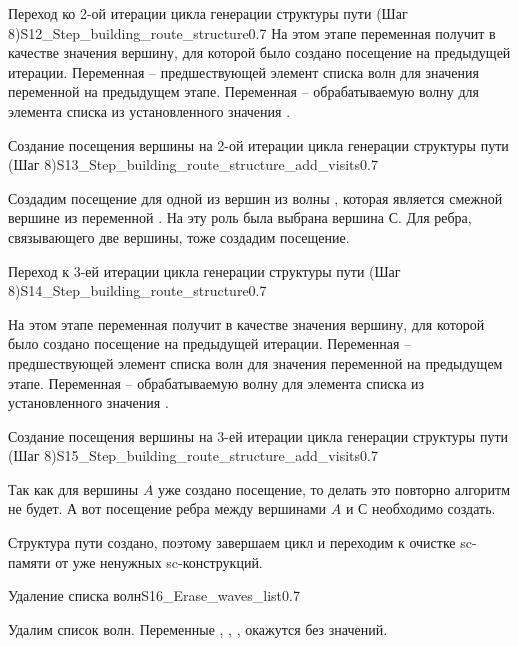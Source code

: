 \begin{itemize}
\begin{algostep}{Переход ко 2-ой итерации цикла генерации структуры
    пути (Шаг 8)}{S12_Step_building_route_structure}{0.7}
  На этом этапе переменная  получит в качестве
  значения вершину, для которой было создано посещение на предыдущей
  итерации. Переменная  – предшествующей элемент
  списка волн для значения переменной  на предыдущем
  этапе. Переменная  – обрабатываемую волну для
  элемента списка из установленного значения .
\end{algostep}


\begin{algostep}{Создание посещения вершины на 2-ой итерации цикла
    генерации структуры пути (Шаг
    8)}{S13_Step_building_route_structure_add_visits}{0.7}

  Создадим посещение для одной из вершин из волны ,
  которая является смежной вершине из переменной
  . На эту роль была выбрана вершина $С$. Для
  ребра, связывающего две вершины, тоже создадим посещение.
\end{algostep}


\begin{algostep}{Переход к 3-ей итерации цикла генерации структуры пути
    (Шаг 8)}{S14_Step_building_route_structure}{0.7}
 
  На этом этапе переменная  получит в качестве
  значения вершину, для которой было создано посещение на предыдущей
  итерации. Переменная  – предшествующей элемент
  списка волн для значения переменной  на предыдущем
  этапе. Переменная  – обрабатываемую волну для
  элемента списка из установленного значения .
\end{algostep}


\begin{algostep}{Создание посещения вершины на 3-ей итерации цикла
    генерации структуры пути (Шаг
    8)}{S15_Step_building_route_structure_add_visits}{0.7}
 
  Так как для вершины $A$ уже создано посещение, то делать это
  повторно алгоритм не будет. А вот посещение ребра между вершинами
  $A$ и $С$ необходимо создать.

  Структура пути создано, поэтому завершаем цикл и переходим к очистке
  sc-памяти от уже ненужных sc-конструкций.
\end{algostep}

\begin{algostep}{Удаление списка волн}{S16_Erase_waves_list}{0.7}
 
  Удалим список волн. Переменные ,
  , ,
   окажутся без значений.
\end{algostep}



\end{itemize}
